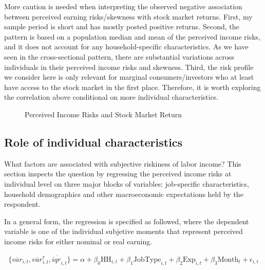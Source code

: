 \documentclass[12pt,notitlepage,onecolumn,aps,pra]{article}
\begin{document}
More caution is needed when interpreting the observed negative
association between perceived earning risks/skewness with stock market
returns. First, my sample period is short and has mostly posted positive
returns. Second, the pattern is based on a population median and mean of
the perceived income risks, and it does not account for any
household-specific characteristics. As we have seen in the
cross-sectional pattern, there are substantial variations across
individuals in their perceived income risks and skewness. Third, the
risk profile we consider here is only relevant for marginal
consumers/investors who at least have access to the stock market in the
first place. Therefore, it is worth exploring the correlation above
conditional on more individual characteristics.


    \begin{figure*}[!ht]
        \begin{center}\end{center}
        \caption{Perceived Income Risks and Stock Market Return}
        \label{fig:tssp500}
    \end{figure*}
    

    \hypertarget{role-of-individual-characteristics}{%
\subsection{Role of individual
characteristics}\label{role-of-individual-characteristics}}

What factors are associated with subjective riskiness of labor income?
This section inspects the question by regressing the perceived income
risks at individual level on three major blocks of variables:
job-specific characteristics, household demographics and other
macroeconomic expectations held by the respondent.

In a general form, the regression is specified as followed, where the
dependent variable is one of the individual subjetive moments that
represent perceived income risks for either nominal or real earning.

\begin{eqnarray}
\{\overline{var}_{i,t}, \overline{var}^r_{i,t}, \overline{iqr}_{i,t}\} = \alpha + \beta_0 \textrm{HH}_{i,t} + \beta_1 \textrm{JobType}_{i,t} + \beta_2 \textrm{Exp}_{i,t} + \beta_3 \textrm{Month}_t + \epsilon_{i,t}
\end{eqnarray}
\end{document}
